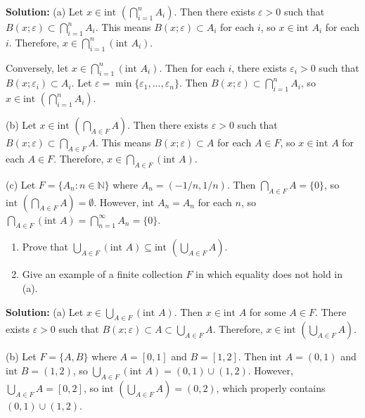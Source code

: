 \textbf{Solution:} 
(a) Let $x \in \text{int }(\bigcap_{i=1}^n A_i)$. Then there exists $\varepsilon > 0$ such that $B(x;\varepsilon) \subset \bigcap_{i=1}^n A_i$. This means $B(x;\varepsilon) \subset A_i$ for each $i$, so $x \in \text{int } A_i$ for each $i$. Therefore, $x \in \bigcap_{i=1}^n (\text{int } A_i)$.

Conversely, let $x \in \bigcap_{i=1}^n (\text{int } A_i)$. Then for each $i$, there exists $\varepsilon_i > 0$ such that $B(x;\varepsilon_i) \subset A_i$. Let $\varepsilon = \min\{\varepsilon_1, \ldots, \varepsilon_n\}$. Then $B(x;\varepsilon) \subset \bigcap_{i=1}^n A_i$, so $x \in \text{int }(\bigcap_{i=1}^n A_i)$.

(b) Let $x \in \text{int }(\bigcap_{A \in F} A)$. Then there exists $\varepsilon > 0$ such that $B(x;\varepsilon) \subset \bigcap_{A \in F} A$. This means $B(x;\varepsilon) \subset A$ for each $A \in F$, so $x \in \text{int } A$ for each $A \in F$. Therefore, $x \in \bigcap_{A \in F} (\text{int } A)$.

(c) Let $F = \{A_n : n \in \mathbb{N}\}$ where $A_n = (-1/n, 1/n)$. Then $\bigcap_{A \in F} A = \{0\}$, so $\text{int }(\bigcap_{A \in F} A) = \emptyset$. However, $\text{int } A_n = A_n$ for each $n$, so $\bigcap_{A \in F} (\text{int } A) = \bigcap_{n=1}^{\infty} A_n = \{0\}$.

\begin{problembox}
\begin{enumerate}[label=\alph*)]
\item Prove that \(\bigcup_{A \in F} (\text{int } A) \subseteq \text{int } \left(\bigcup_{A \in F} A\right)\).
\item Give an example of a finite collection \( F \) in which equality does not hold in (a).
\end{enumerate}
\end{problembox}

\textbf{Solution:} 
(a) Let $x \in \bigcup_{A \in F} (\text{int } A)$. Then $x \in \text{int } A$ for some $A \in F$. There exists $\varepsilon > 0$ such that $B(x;\varepsilon) \subset A \subset \bigcup_{A \in F} A$. Therefore, $x \in \text{int }(\bigcup_{A \in F} A)$.

(b) Let $F = \{A, B\}$ where $A = [0,1]$ and $B = [1,2]$. Then $\text{int } A = (0,1)$ and $\text{int } B = (1,2)$, so $\bigcup_{A \in F} (\text{int } A) = (0,1) \cup (1,2)$. However, $\bigcup_{A \in F} A = [0,2]$, so $\text{int }(\bigcup_{A \in F} A) = (0,2)$, which properly contains $(0,1) \cup (1,2)$.

